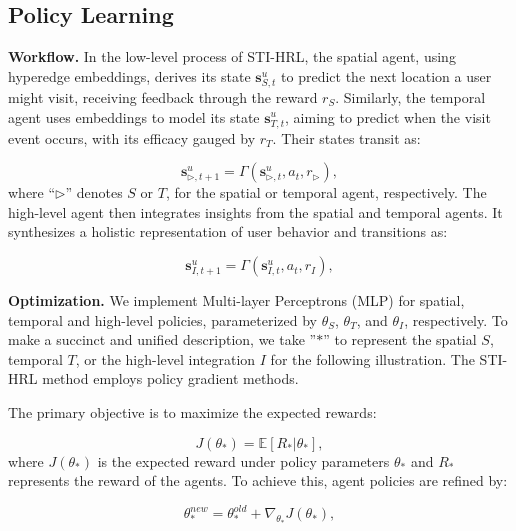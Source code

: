 \documentclass[letterpaper]{article} %
\begin{document}
\subsection{Policy Learning} 

\noindent \textbf{Workflow. }
In the low-level process of STI-HRL, 
the spatial agent, using hyperedge embeddings, derives its state $ \mathbf{s}^{u}_{S,t} $ to predict the next location a user might visit, receiving feedback through the reward $ r_S $. 
Similarly, the temporal agent uses embeddings to model its state $ \mathbf{s}^{u}_{T,t} $, aiming to predict when the visit event occurs, with its efficacy gauged by $ r_T $. Their states transit as:

\begin{equation}
\mathbf{s}^{u}_{\triangleright,t+1} = \Gamma(\mathbf{s}^{u}_{\triangleright,t}, a_{t}, r_\triangleright), 
\end{equation}
where ``$\triangleright$'' denotes $S$ or $T$, for the spatial or temporal agent, respectively.
The high-level agent then integrates insights from the spatial and temporal agents. It synthesizes a holistic representation of user behavior and transitions as:

\begin{equation}
 \mathbf{s}^{u}_{I,t+1} = \Gamma(\mathbf{s}^{u}_{I,t}, a_{t}, r_{I}),
\end{equation}

\noindent \textbf{Optimization. }
We implement Multi-layer Perceptrons (MLP) for spatial, temporal and high-level policies, parameterized by $\theta_{S}$, $\theta_{T}$, and $\theta_{I}$, respectively. 
To make a succinct and unified description, we take ''$*$'' to represent the spatial $S$, temporal $T$, or the high-level integration $I$ for the following illustration.
The STI-HRL method employs policy gradient \cite{agarwal2020optimality} methods. 
 
The primary objective is to maximize the expected rewards:

\begin{equation}
    J(\theta_*) = \mathbb{E}[R_{*} | \theta_{*}],
\end{equation}
where $ J(\theta_*) $ is the expected reward under policy parameters $ \theta_* $ and $ R_* $ represents the reward of the agents. To achieve this, agent policies are refined by:

\begin{equation}
      \theta_{*}^{new} = \theta_{*}^{old} + \nabla_{\theta_{*}} J(\theta_*),
\end{equation}
\end{document}
